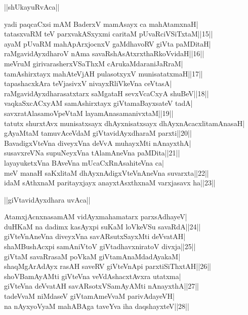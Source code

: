 \documentclass{article}
\begin{document}
\begin{center}
||shUkayuRvAca||
\end{center}

yadi paqcaCxsi mAM BaderxV mamAsayx ca mahAtamxnaH|\\
tatasxvaRM teV parxvakASxyxmi caritaM pUvaRciVSiTxtaM||15||\\
ayaM pUvaRM mahApArxjocnxV gaMdhavoRV giVta paMDitaH|\\
raMgavidAyxdharoV nAma savaRshAsAtxrxthaRkoVvidaH||16||\\
meVruM girivarasherxVSaThxM cArukaMdaraniJaRraM|\\
tamAshirxtayx mahAteVjAH pulasotxyxV munisatatxmaH||17||\\
tapashacxkAra teVjasivxV nivayxRliVkeVna ceVtasA|\\
raMgavidAyxdharasatxtarx saMgataH sevxVcaCxyA shuBeV||18||\\
vaqkaSxcACxyAM samAshirxtayx giVtamaBayxsateV tadA|\\
savxratAlasamoVpeVtaM layamAnasamanivxtaM||19||\\
tatutx shurxtAvx munisatxsayx dhAyxnisatxsayx dhAyxnAcacxlitamAnasaH|\\
gAyaMtaM tamuvAceVdaM giVtavidAyxdharaM parxti||20||\\
BavadigxVteVna diveyxVna deVvA muhayxMti nAnayxthA|\\
susavxreVNa supuNeyxVna tAlamAneVna paMDita||21||\\
layayuketxVna BAveVna mUcaCxRnAsahiteVna ca|\\
meV manaH saKxlitaM dhAyxnAdigxVteVnAneVna suvarxta||22||\\
idaM sAthxnaM paritayxjayx anayxtAsxthxnaM varxjasavx ha||23||\\

\begin{center}
||giVtavidAyxdhara uvAca||
\end{center}

AtamxjAcnxnasamAM vidAyxmahamatarx parxsAdhayeV|\\
duHKaM na dadimx kasAyxpi suKaM loVkeVSu savaRdA||24||\\
giVteVnAneVna diveyxVna savARsutxSayxMti deVvatAH|\\
shaMBushAcxpi samAniVtoV giVtadhavxniratoV divxja||25||\\
giVtaM savaRrasaM poVkaM giVtamAnaMdadAyakaM|\\
shaqMgArAdAyx rasAH saveRV giVteVnApi parxtiSiThxtAH||26||\\
shoVBamAyAMti giVteVna veVdAshacxtAvxra utatxma|\\
giVteVna deVvatAH savARsotxVSamAyAMti nAnayxthA||27||\\
tadeVvaM niMdaseV giVtamAmeVvaM parivAdayeVH|\\
na nAyxyoVyaM mahABAga taveYva iha daqshayxteV||28||\\
\end{document}

